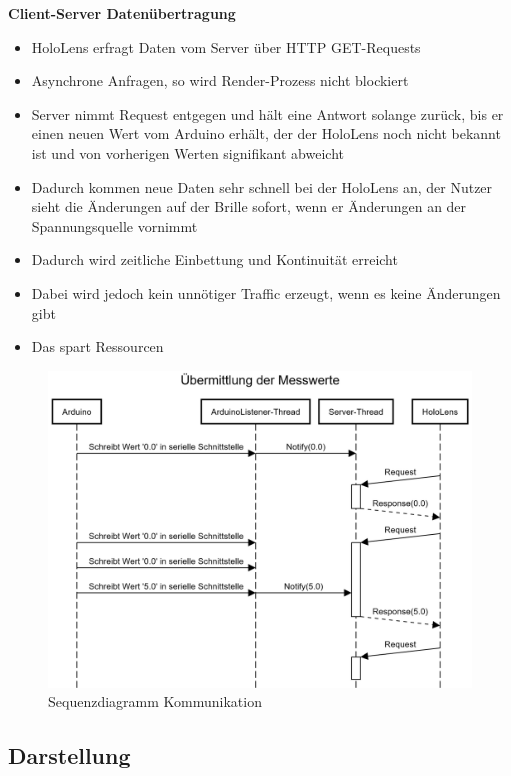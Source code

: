 \textbf{Client-Server Datenübertragung}
\begin{itemize}
	\item HoloLens erfragt Daten vom Server über HTTP GET-Requests
	\item Asynchrone Anfragen, so wird Render-Prozess nicht blockiert
	\item Server nimmt Request entgegen und hält eine Antwort solange zurück, bis er einen neuen Wert vom Arduino erhält, der der HoloLens noch nicht bekannt ist und von vorherigen Werten signifikant abweicht
	\item Dadurch kommen neue Daten sehr schnell bei der HoloLens an, der Nutzer sieht die Änderungen auf der Brille sofort, wenn er Änderungen an der Spannungsquelle vornimmt
	\item Dadurch wird zeitliche Einbettung und Kontinuität erreicht
	\item Dabei wird jedoch kein unnötiger Traffic erzeugt, wenn es keine Änderungen gibt
	\item Das spart Ressourcen
\end{itemize}
\begin{figure}[h!]
	\centering
	\includegraphics[width=1\textwidth]{images/Sequenzdiagramm.png}
	\caption{Sequenzdiagramm Kommunikation}
	\label{img:Sequenzdiagramm}
\end{figure}

\subsection{Darstellung}


